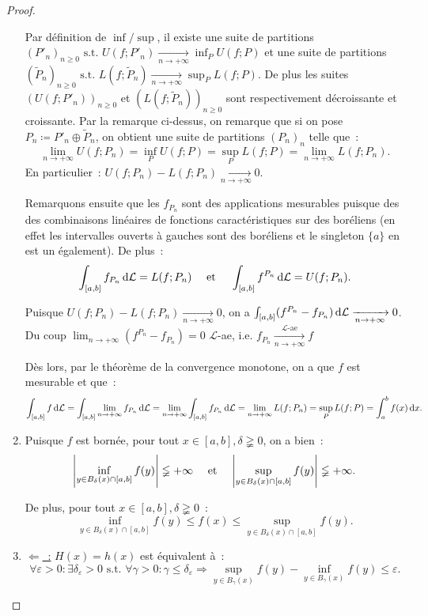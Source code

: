 \documentclass{article}
\newcommand{\pinfty}{{+\infty}}
\newcommand{\st}{\text{ s.t. }}
\begin{document}
\begin{proof}
\begin{enumerate}
	Par définition de $\inf/\sup$, il existe une suite de partitions $(P'_n)_{n \geq 0} \st U(f; P'_n) \xrightarrow[n \to \pinfty]{} \inf_PU(f; P)$ et
	une suite de partitions $(\tilde P_n)_{n \geq 0} \st L(f; \tilde P_n) \xrightarrow[n \to \pinfty]{} \sup_PL(f; P)$. De plus les suites $(U(f; P'_n))_{n \geq 0}$
	et $(L(f; \tilde P_n))_{n \geq 0}$ sont respectivement décroissante et croissante. Par la remarque ci-dessus, on remarque que si on pose $P_n \coloneqq P'_n \oplus \tilde P_n$,
	on obtient une suite de partitions $(P_n)_n$ telle que~:
	\[\lim_{n \to \pinfty}U(f; P_n) = \inf_PU(f; P) = \sup_PL(f; P) = \lim_{n \to \pinfty} L(f; P_n).\]
	En particulier~: $U(f; P_n) - L(f; P_n) \xrightarrow[n \to \pinfty]{} 0$.

	Remarquons ensuite que les $f_{P_n}$ sont des applications mesurables puisque des des combinaisons linéaires de fonctions caractéristiques sur des boréliens (en effet
	les intervalles ouverts à gauches sont des boréliens et le singleton $\{a\}$ en est un également). De plus~:
	\[\int_{[a, b]} f_{P_n}\dif\mathcal L = L(f; P_n) \quad\text{ et }\quad \int_{[a, b]} f^{P_n}\dif\mathcal L = U(f; P_n).\]

	Puisque $U(f; P_n) - L(f; P_n) \xrightarrow[n \to \pinfty]{} 0$, on a $\int_{[a, b]}(f^{P_n}-f_{P_n})\dif \mathcal L \xrightarrow[n \to \pinfty]{} 0$.
	Du coup $\lim_{n \to \pinfty}(f^{P_n} - f_{P_n}) = 0$ $\mathcal L$-ae, i.e. $f_{P_n} \xrightarrow[n \to \pinfty]{\mathcal L\text{-ae}} f$

	Dès lors, par le théorème de la convergence monotone, on a que $f$ est mesurable et que~:
	\[\int_{[a, b]} f\dif\mathcal L = \int_{[a, b]} \lim_{n \to \pinfty}f_{P_n}\dif\mathcal L = \lim_{n \to \pinfty}\int_{[a, b]}f_{P_n}\dif\mathcal L = \lim_{n \to \pinfty}L(f; P_n)
	= \sup_PL(f; P) = \int_a^bf(x)\dif x.\]

	\item Puisque $f$ est bornée, pour tout $x \in [a, b], \delta \gneqq 0$, on a bien~:
	\[\abs {\inf_{y \in B_\delta(x) \cap [a, b]}f(y)} \lneqq \pinfty \quad\text{ et }\quad \abs {\sup_{y \in B_\delta(x) \cap [a, b]}f(y)} \lneqq \pinfty.\]

	De plus, pour tout $x \in [a, b], \delta \gneqq 0$~:
	\[\inf_{y \in B_\delta(x) \cap [a, b]} f(y) \leq f(x) \leq \sup_{y \in B_\delta(x) \cap [a, b]}f(y).\]

	\item \underline {$\Leftarrow$~:} $H(x) = h(x)$ est équivalent à~:
	\[\forall \varepsilon > 0 : \exists \delta_\varepsilon > 0 \st \forall \gamma > 0 : \gamma \leq \delta_\varepsilon \Rightarrow
	\sup_{y \in B_\gamma(x)}f(y) - \inf_{y \in B_\gamma(x)}f(y) \leq \varepsilon.\]


\end{enumerate}
\end{proof}
\end{document}
